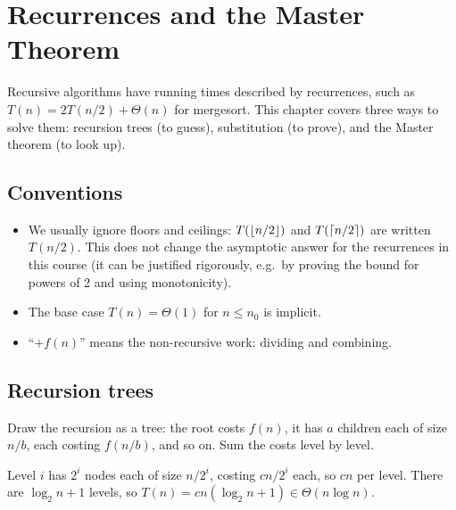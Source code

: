 \chapter{Recurrences and the Master Theorem}

Recursive algorithms have running times described by recurrences, such as
$T(n)=2T(n/2)+\Theta(n)$ for mergesort. This chapter covers three ways to solve them:
recursion trees (to guess), substitution (to prove), and the Master theorem (to look up).

\section{Conventions}
\begin{itemize}
  \item We usually ignore floors and ceilings: $T(\left\lfloor n/2 \right\rfloor)$ and $T(\left\lceil n/2 \right\rceil)$ are written $T(n/2)$.
        This does not change the asymptotic answer for the recurrences in this course
        (it can be justified rigorously, e.g.\ by proving the bound for powers of 2 and using monotonicity).
  \item The base case $T(n)=\Theta(1)$ for $n\le n_0$ is implicit.
  \item ``$+f(n)$'' means the non-recursive work: dividing and combining.
\end{itemize}

\section{Recursion trees}
Draw the recursion as a tree: the root costs $f(n)$, it has $a$ children each of size $n/b$, each costing $f(n/b)$, and so on.
Sum the costs level by level.

\begin{example}[$T(n)=2T(n/2)+cn$]
Level $i$ has $2^i$ nodes each of size $n/2^i$, costing $cn/2^i$ each, so $cn$ per level.
There are $\log_2 n+1$ levels, so $T(n)=cn(\log_2 n+1)\in\Theta(n\log n)$.
\end{example}

\begin{center}
\end{center}

